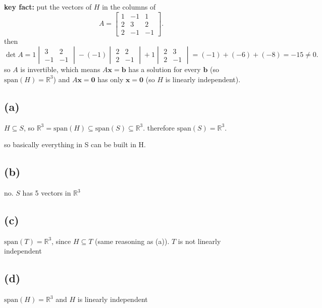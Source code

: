 \documentclass{article}
\begin{document}
\textbf{key fact:} put the vectors of $H$ in the columns of
\[
A = \begin{bmatrix} 1 & -1 & 1 \\ 2 & 3 & 2 \\ 2 & -1 & -1 \end{bmatrix}.
\]
then
\[
\det A
= 1\begin{vmatrix} 3 & 2 \\ -1 & -1 \end{vmatrix}
- (-1)\begin{vmatrix} 2 & 2 \\ 2 & -1 \end{vmatrix}
+ 1\begin{vmatrix} 2 & 3 \\ 2 & -1 \end{vmatrix}
= (-1) + (-6) + (-8) = -15 \neq 0.
\]
so $A$ is invertible, which means $A\mathbf{x} = \mathbf{b}$ has a solution for
every $\mathbf{b}$ (so $\mathrm{span}(H) = \mathbb{R}^3$) and $A\mathbf{x} = \mathbf{0}$
has only $\mathbf{x} = \mathbf{0}$ (so $H$ is linearly independent).

\subsection*{(a)}

$H \subseteq S$, so $\mathbb{R}^3 = \mathrm{span}(H) \subseteq \mathrm{span}(S) \subseteq \mathbb{R}^3$.
therefore $\mathrm{span}(S) = \mathbb{R}^3$.

\textbf{} so basically everything in S can be built in H.

\subsection*{(b)}

no. $S$ has 5 vectors in $\mathbb{R}^3$
\subsection*{(c)}

$\mathrm{span}(T) = \mathbb{R}^3$, since $H \subseteq T$ (same reasoning as (a)).
$T$ is not linearly independent

\subsection*{(d)}

$\mathrm{span}(H) = \mathbb{R}^3$ and $H$ is linearly independent
\end{document}
